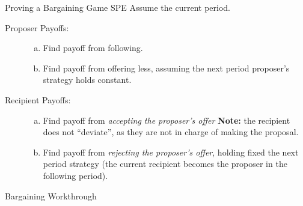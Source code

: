 \documentclass[10pt]{extarticle}
\begin{document}
  \begin{problem}{Proving a Bargaining Game SPE}
    Assume the current period.
    \begin{description}
      \item[Proposer Payoffs:]
        \begin{enumerate}[(a)]
          \item Find payoff from following.
          \item Find payoff from offering less, assuming the next period proposer's strategy holds constant.
        \end{enumerate}
      \item[Recipient Payoffs:]
        \begin{enumerate}[(a)]
          \item Find payoff from \textit{accepting the proposer's offer} {\tiny \textbf{Note:} the recipient does not ``deviate'', as they are not in charge of making the proposal.}
          \item Find payoff from \textit{rejecting the proposer's offer}, holding fixed the next period strategy (the current recipient becomes the proposer in the following period).
        \end{enumerate}
    \end{description}
  \end{problem}
  \begin{problem}{Bargaining Workthrough}
    \begin{tcbraster}[raster columns = 1,colframe = black!75!white,colback=white]
    \end{tcbraster}
  \end{problem}
\end{document}
